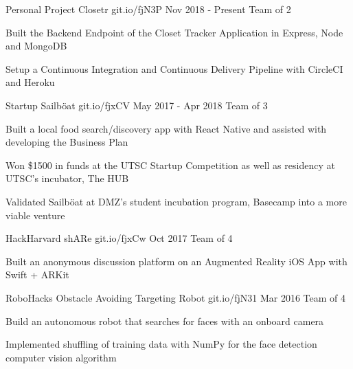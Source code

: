 \begin{cventries}
\cventry
    {Personal Project}
    {Closetr}
    {git.io/fjN3P}
    {Nov 2018 - Present}
    {Team of 2}
    {
      \begin{cvitems}
        \item{Built the Backend Endpoint of the Closet Tracker Application in Express, Node and MongoDB}
        \item{Setup a Continuous Integration and Continuous Delivery Pipeline with CircleCI and Heroku}
      \end{cvitems}
    }
\cventry
  {Startup}
  {Sailböat}
  {git.io/fjxCV}
  {May 2017 - Apr 2018}
  {Team of 3}
  {
    \begin{cvitems}
      \item {Built a local food search/discovery app with React Native and assisted with developing the Business Plan}
      \item {Won \$1500 in funds at the UTSC Startup Competition as well as residency at UTSC's incubator, The HUB}
      \item {Validated Sailböat at DMZ's student incubation program, Basecamp into a more viable venture}
    \end{cvitems}
  }
\cventry
  {HackHarvard}
  {shARe}
  {git.io/fjxCw}
  {Oct 2017}
  {Team of 4}
  {
    \begin{cvitems}
      \item {Built an anonymous discussion platform on an Augmented Reality iOS App with Swift + ARKit}
    \end{cvitems}
  }
\cventry
  {RoboHacks}
  {Obstacle Avoiding Targeting Robot}
  {git.io/fjN31}
  {Mar 2016}
  {Team of 4}
  {
    \begin{cvitems}
      \item {Build an autonomous robot that searches for faces with an onboard camera}
      \item {Implemented shuffling of training data with NumPy for the face detection computer vision algorithm}
    \end{cvitems}
  }
\end{cventries}
